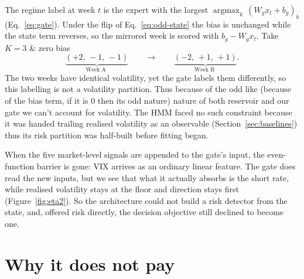 The regime label at week $t$ is the expert with the largest $\operatorname{argmax}_k\,(W_g x_t + b_g)_k$ (Eq.~\ref{eq:gate}). Under the flip of Eq.~\ref{eq:odd-state} the bias is unchanged while the state term reverses, so the mirrored week is scored with $b_g - W_g x_t$. Take $K = 3$ \& zero bias
\begin{equation}
  \underbrace{(+2,\,-1,\,-1)}_{\text{Week A }}
  \qquad\longrightarrow\qquad
  \underbrace{(-2,\,+1,\,+1)}_{\text{Week B }}.
  \label{eq:flip-example}
\end{equation}
The two weeks have identical volatility, yet the gate labels them differently, so this labelling is not a volatility partition. Thus because of the odd like (because of the bias term, if it is 0 then its odd nature) nature of both reservoir and our gate we can't account for volatility. The HMM faced no such constraint because it was handed trailing realised volatility as an observable (Section~\ref{sec:baselines}) thus its risk partition was half-built before fitting began.

When the five market-level signals are appended to the gate's input, the even-function barrier is gone: VIX arrives as an ordinary linear feature. The gate does read the new inputs, but we see that what it actually absorbs is the short rate, while realised volatility stays at the floor and direction stays first (Figure~\ref{fig:eta2}). So the architecture could not build a risk detector from the state, and, offered risk directly, the decision objective still declined to become one. 

\section{Why it does not pay}
\label{sec:disc-null}

